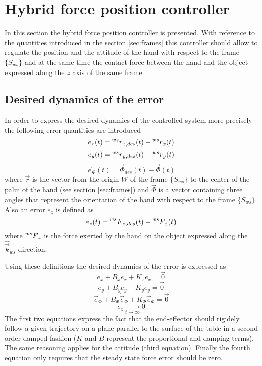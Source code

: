 \section{Hybrid force position controller}
In this section the hybrid force position controller is presented.
With reference to the quantities introduced in the section \ref{sec:frames}
this controller should allow to regulate the position and the attitude of the hand
with respect to the frame $\{S_{ws}\}$ and at the same time the contact force between
the hand and the object expressed along the $z$ axis of the same frame.

\subsection{Desired dynamics of the error}\label{sec:desired_dyn}
In order to express the desired dynamics of the controlled system
more precisely the following error quantities are introduced
\[
e_x(t) =   \prescript{ws}{} r_{x,des}(t) - \prescript{ws}{} r_{x}(t)
\]
\[
e_y(t) =   \prescript{ws}{} r_{y,des}(t) - \prescript{ws}{} r_{y}(t)
\]
\[
\vec{e}_{\Phi}(t) = \vec{\Phi}_{des}(t) - \vec{\Phi}(t)
\]
where $\vec{r}$ is the vector from the origin $W$ of the frame $\{S_{ws}\}$ to the
center of the palm of the hand (see section \ref{sec:frames}) and $\vec{\Phi}$ is
a vector containing three angles that represent the orientation of the hand with respect
to the frame $\{S_{ws}\}$.
Also an error $e_z$ is defined as
\[
e_{z}(t) = \prescript{ws}{} F_{z,des}(t) - \prescript{ws}{} F_{z}(t)
\]
where $\prescript{ws}{} F_{z}$ is the force exerted by the hand on the object expressed
along the $\hat{\vec{k}}_{ws}$ direction.
\par
Using these definitions the desired dynamics of the error is expressed as
\[
\ddot{e}_{x} + B_x \dot{e}_x + K_x e_x = \vec{0} %
\]
\[
\ddot{e}_{y} + B_y \dot{e}_y + K_y e_y = \vec{0} %
\]
\[
\ddot{\vec{e}}_{\Phi} + B_{\Phi} \dot{\vec{e}}_{\Phi} + K_{\Phi} \vec{e}_{\Phi} = \vec{0} %
\]
\[
e_z \xrightarrow[t \to \infty]{} 0
\]
The first two equations express the fact that the end-effector should rigidely follow
a given trajectory on a plane parallel to the surface of the table in a second order damped
fashion ($K$ and $B$ represent the proportional and damping terms).
The same reasoning applies for the attitude (third equation).
Finally the fourth equation only requires that the steady state force error should be zero.

